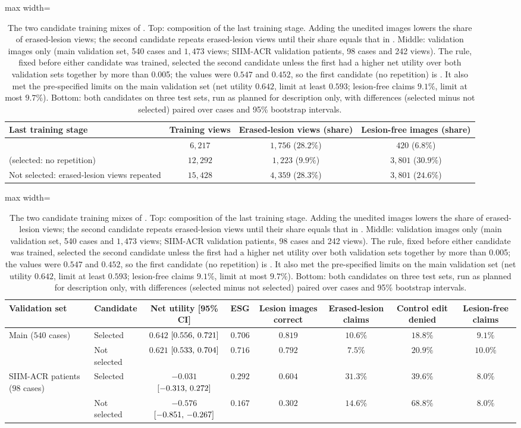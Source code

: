 \begin{table}[!htbp]
\caption{The two candidate training mixes of \msn{}. Top: composition of the last training stage. Adding the unedited images lowers the share of erased-lesion views; the second candidate repeats erased-lesion views until their share equals that in \msp{}. Middle: validation images only (main validation set, 540 cases and $1{,}473$ views; SIIM-ACR validation patients, 98 cases and 242 views). The rule, fixed before either candidate was trained, selected the second candidate unless the first had a higher net utility over both validation sets together by more than 0.005; the values were $0.547$ and $0.452$, so the first candidate (no repetition) is \msn{}. It also met the pre-specified limits on the main validation set (net utility $0.642$, limit at least $0.593$; lesion-free claims $9.1\%$, limit at most $9.7\%$). Bottom: both candidates on three test sets, run as planned for description only, with differences (selected minus not selected) paired over cases and 95\% bootstrap intervals.}
\label{tab:s_mix}
\centering
\footnotesize
\begin{adjustbox}{max width=\linewidth}
\begin{tabular}{l ccc}
\toprule
Last training stage & Training views & Erased-lesion views (share) & Lesion-free images (share) \\
\midrule
\msp{} & $6{,}217$ & $1{,}756$ ($28.2\%$) & $420$ ($6.8\%$) \\
\msn{} (selected: no repetition) & $12{,}292$ & $1{,}223$ ($9.9\%$) & $3{,}801$ ($30.9\%$) \\
Not selected: erased-lesion views repeated & $15{,}428$ & $4{,}359$ ($28.3\%$) & $3{,}801$ ($24.6\%$) \\
\bottomrule
\end{tabular}
\end{adjustbox}

\vspace{0.6em}
\begin{adjustbox}{max width=\linewidth}
\begin{tabular}{ll cccccc}
\toprule
Validation set & Candidate & Net utility [95\% CI] & ESG & Lesion images correct & Erased-lesion claims & Control edit denied & Lesion-free claims \\
\midrule
Main ($540$ cases) & Selected & $0.642$ $[0.556,\,0.721]$ & $0.706$ & $0.819$ & $10.6\%$ & $18.8\%$ & $9.1\%$ \\
 & Not selected & $0.621$ $[0.533,\,0.704]$ & $0.716$ & $0.792$ & $7.5\%$ & $20.9\%$ & $10.0\%$ \\
SIIM-ACR patients ($98$ cases) & Selected & $-0.031$ $[-0.313,\,0.272]$ & $0.292$ & $0.604$ & $31.3\%$ & $39.6\%$ & $8.0\%$ \\
 & Not selected & $-0.576$ $[-0.851,\,-0.267]$ & $0.167$ & $0.302$ & $14.6\%$ & $68.8\%$ & $8.0\%$ \\
\bottomrule
\end{tabular}
\end{adjustbox}


\end{table}
